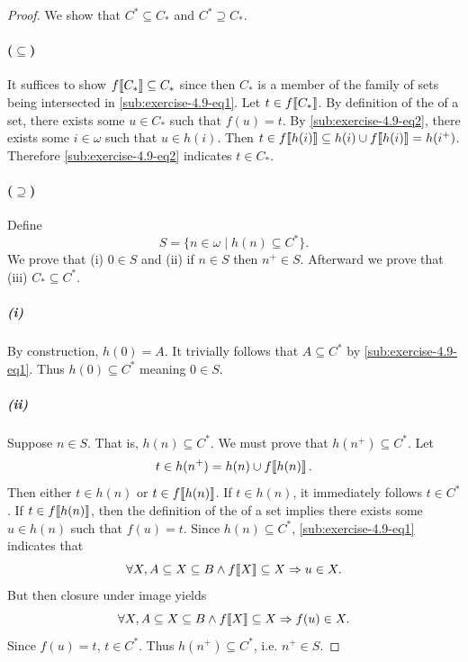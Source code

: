 \documentclass{report}
\begin{document}
\begin{proof}

  We show that $C^* \subseteq C_*$ and $C^* \supseteq C_*$.

  \paragraph{($\subseteq$)}%

    It suffices to show $f\!\left\llbracket C_*\right\rrbracket \subseteq C_*$ since then $C_*$ is a
      member of the family of sets being intersected in
      \eqref{sub:exercise-4.9-eq1}.
    Let $t \in f\!\left\llbracket C_*\right\rrbracket$.
    By definition of the  of a set, there exists some
      $u \in C_*$ such that $f(u) = t$.
    By \eqref{sub:exercise-4.9-eq2}, there exists some $i \in \omega$ such that
      $u \in h(i)$.
    Then $t \in f\!\left\llbracket h(i)\right\rrbracket \subseteq h(i) \cup f\!\left\llbracket h(i)\right\rrbracket = h(i^+)$.
    Therefore \eqref{sub:exercise-4.9-eq2} indicates $t \in C_*$.

  \paragraph{($\supseteq$)}%

    Define $$S = \{n \in \omega \mid h(n) \subseteq C^*\}.$$
    We prove that (i) $0 \in S$ and (ii) if $n \in S$ then $n^+ \in S$.
    Afterward we prove that (iii) $C_* \subseteq C^*$.

    \subparagraph{(i)}%
    \label{spar:exercise-4.9-i}

      By construction, $h(0) = A$.
      It trivially follows that $A \subseteq C^*$ by
        \eqref{sub:exercise-4.9-eq1}.
      Thus $h(0) \subseteq C^*$ meaning $0 \in S$.

    \subparagraph{(ii)}%
    \label{spar:exercise-4.9-ii}

      Suppose $n \in S$.
      That is, $h(n) \subseteq C^*$.
      We must prove that $h(n^+) \subseteq C^*$.
      Let $$t \in h(n^+) = h(n) \cup f\!\left\llbracket h(n)\right\rrbracket.$$
      Then either $t \in h(n)$ or $t \in f\!\left\llbracket h(n)\right\rrbracket$.
      If $t \in h(n)$, it immediately follows $t \in C^*$.
      If $t \in f\!\left\llbracket h(n)\right\rrbracket$, then the definition of the 
        of a set implies there exists some $u \in h(n)$ such that $f(u) = t$.
      Since $h(n) \subseteq C^*$, \eqref{sub:exercise-4.9-eq1} indicates that
        $$\forall X, A \subseteq X \subseteq B \land
          f\!\left\llbracket X\right\rrbracket \subseteq X \Rightarrow u \in X.$$
      But then closure under image yields
        $$\forall X, A \subseteq X \subseteq B \land
          f\!\left\llbracket X\right\rrbracket \subseteq X \Rightarrow f(u) \in X.$$
      Since $f(u) = t$, $t \in C^*$.
      Thus $h(n^+) \subseteq C^*$, i.e. $n^+ \in S$.


\end{proof}
\end{document}
